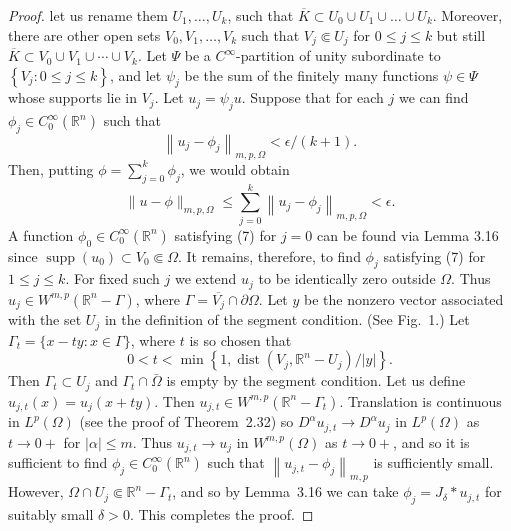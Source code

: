 \begin{proof}
  let us rename them $U_1, \ldots, U_k$,
  such that $\overline{K} \subset U_0 \cup U_1 \cup \ldots \cup U_k$.
  Moreover, there are other open sets $V_0, V_1, \ldots, V_k$
  such that $V_j \Subset U_j$ for $0 \leq j \leq k$
  but still $\overline{K} \subset V_0 \cup V_1 \cup \cdots \cup V_k$.
  Let $\Psi$ be a $C^{\infty}$-partition of unity subordinate to $\left\{V_j: 0 \leq j \leq k\right\}$, and let $\psi_j$ be the sum of the finitely many functions $\psi \in \Psi$ whose supports lie in $V_j$. Let $u_j=\psi_j u$. Suppose that for each $j$ we can find $\phi_j \in C_0^{\infty}\left(\mathbb{R}^n\right)$ such that
  \begin{equation}\label{eq:3.7}
    \left\|u_j-\phi_j\right\|_{m, p, \Omega}<\epsilon /(k+1) .
  \end{equation}
  Then, putting $\phi=\sum_{j=0}^k \phi_j$, we would obtain
  \[
  \|u-\phi\|_{m, p, \Omega} \leq \sum_{j=0}^k\left\|u_j-\phi_j\right\|_{m, p, \Omega}<\epsilon .
  \]
  A function $\phi_0 \in C_0^{\infty}\left(\mathbb{R}^n\right)$ satisfying (7) for $j=0$ can be 
  found via Lemma 3.16 since $\operatorname{supp}\left(u_0\right) \subset V_0 \Subset \Omega$.
  It remains, therefore, to find $\phi_j$ satisfying (7) for $1 \leq j \leq k$.
  For fixed such $j$ we extend $u_j$ to be identically zero outside $\Omega$.
  Thus $u_j \in W^{m, p}\left(\mathbb{R}^n-\Gamma\right)$,
  where $\Gamma=\overline{V_j} \cap\partial\Omega$.
  Let $y$ be the nonzero vector associated with the set $U_j$ in the definition of the segment 
  condition. (See Fig.~1.) Let $\Gamma_t=\{x-t y: x \in \Gamma\}$, where $t$ is so chosen that
  \[
  0<t<\min \left\{1, \operatorname{dist}\left(V_j, \mathbb{R}^n-U_j\right) /|y|\right\}.
  \]
  Then $\Gamma_t \subset U_j$ and $\Gamma_t \cap \bar{\Omega}$ is empty by the segment condition. 
  Let us define $u_{j, t}(x)=u_j(x+t y)$.
  Then $u_{j, t} \in W^{m, p}\left(\mathbb{R}^n-\Gamma_t\right)$.
  Translation is continuous in $L^p(\Omega)$ (see the proof of Theorem~2.32)
  so $D^\alpha u_{j, t} \rightarrow D^\alpha u_j$ in $L^p(\Omega)$
  as $t \rightarrow 0+$ for $|\alpha| \leq m$.
  Thus $u_{j, t} \rightarrow u_j$ in $W^{m, p}(\Omega)$ as $t \rightarrow 0+$,
  and so it is sufficient to find $\phi_j \in C_0^{\infty}\left(\mathbb{R}^n\right)$
  such that $\left\|u_{j, t}-\phi_j\right\|_{m, p}$ is sufficiently small.
  However, $\Omega \cap U_j \Subset \mathbb{R}^n-\Gamma_t$,
  and so by Lemma~3.16 we can take $\phi_j=J_\delta * u_{j, t}$ for suitably small $\delta>0$. 
  This completes the proof.
\end{proof}


